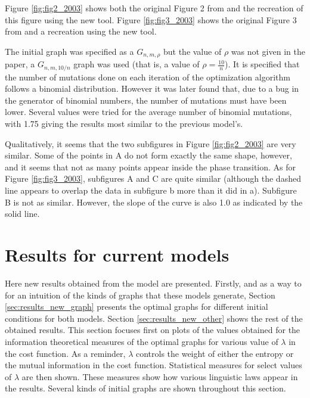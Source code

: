 Figure \ref{fig:fig2_2003} shows both the original Figure 2 from \cite{Ferrer2003a} and the recreation of this figure using the new tool.
Figure \ref{fig:fig3_2003} shows the original Figure 3 from \cite{Ferrer2003a} and a recreation using the new tool.

The initial graph was specified as a $G_{n,m,\rho}$ but the value of $\rho$ was not given in the paper, a $G_{n,m,10/n}$ graph was used (that is, a value of $\rho=\frac{10}{n}$).
It is specified that the number of mutations done on each iteration of the optimization algorithm follows a binomial distribution.
However it was later found that, due to a bug in the generator of binomial numbers, the number of mutations must have been lower.
Several values were tried for the average number of binomial mutations, with 1.75 giving the results most similar to the previous model's.

Qualitatively, it seems that the two subfigures in Figure \ref{fig:fig2_2003} are very similar.
Some of the points in A do not form exactly the same shape, however, and it seems that not as many points appear inside the phase transition.
As for Figure \ref{fig:fig3_2003}, subfigures A and C are quite similar (although the dashed line appears to overlap the data in subfigure b more than it did in a).
Subfigure B is not as similar.
However, the slope of the curve is also 1.0 as indicated by the solid line.


\section{Results for current models}
\label{sec:results_new}

Here new results obtained from the model are presented.
Firstly, and as a way to for an intuition of the kinds of graphs that these models generate, Section \ref{sec:results_new_graph} presents the optimal graphs for different initial conditions for both models.
Section \ref{sec:results_new_other} shows the rest of the obtained results.
This section focuses first on plots of the values obtained for the information theoretical measures of the optimal graphs for various value of $\lambda$ in the cost function.
As a reminder, $\lambda$ controls the weight of either the entropy or the mutual information in the cost function.
Statistical measures for select values of $\lambda$ are then shown.
These measures show how various linguistic laws appear in the results.
Several kinds of initial graphs are shown throughout this section.

